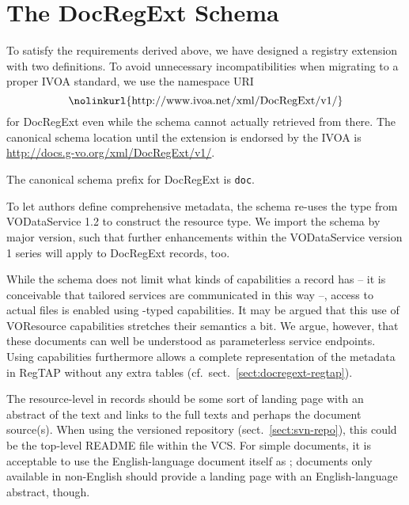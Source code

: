 \documentclass{ivoa}
\begin{document}
\section{The DocRegExt Schema}


\label{sect:regext}

To satisfy the requirements derived above, we have designed a registry extension with
two definitions.
To avoid unnecessary incompatibilities when migrating to a proper IVOA
standard, we use the namespace URI
$$\hbox{\nolinkurl{http://www.ivoa.net/xml/DocRegExt/v1/}}$$
for DocRegExt even while the schema cannot actually retrieved from
there.  The canonical schema location until the extension is endorsed by
the IVOA is \url{http://docs.g-vo.org/xml/DocRegExt/v1/}.

The canonical schema prefix for DocRegExt is \texttt{doc}.

To let authors define comprehensive metadata, the schema
re-uses the  type
from VODataService 1.2 \citep{2021ivoa.spec.1102D} to construct
the  resource type.  We import the schema by major
version, such that further enhancements within the VODataService version
1 series will apply to DocRegExt records, too.

While the schema does not limit what kinds of capabilities a
 record has -- it is conceivable that tailored
services are communicated in this way --, access to actual files is
enabled using -typed capabilities.  It may be
argued that this use of VOResource capabilities stretches their
semantics a bit.  We argue, however, that these documents can well be
understood as parameterless service endpoints.  Using capabilities
furthermore allows a complete representation of the metadata in RegTAP
without any extra tables (cf.~sect.~\ref{sect:docregext-regtap}).

The resource-level  in  records should
be some sort of landing page with an abstract of the text and links to
the full texts and perhaps the document source(s).  When using the
versioned repository (sect.~\ref{sect:svn-repo}), this could be the
top-level README file within the VCS.  For simple documents, it is
acceptable to use the English-language document itself as
; documents only available in non-English should
provide a landing page with an English-language abstract, though.
\end{document}
